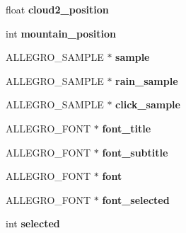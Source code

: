 \begin{DoxyCompactItemize}
\item 
\hypertarget{structMenu_a143c3675204c7cf1381decbfe4be5476}{float {\bfseries cloud2\-\_\-position}}\label{structMenu_a143c3675204c7cf1381decbfe4be5476}

\item 
\hypertarget{structMenu_a10770a9453a92c77d64c7fdb0e34e725}{int {\bfseries mountain\-\_\-position}}\label{structMenu_a10770a9453a92c77d64c7fdb0e34e725}

\item 
\hypertarget{structMenu_a19a25811d2d08b8fa1d1819088168b72}{\-A\-L\-L\-E\-G\-R\-O\-\_\-\-S\-A\-M\-P\-L\-E $\ast$ {\bfseries sample}}\label{structMenu_a19a25811d2d08b8fa1d1819088168b72}

\item 
\hypertarget{structMenu_ad14705d9172d76dc241de8f4657254cc}{\-A\-L\-L\-E\-G\-R\-O\-\_\-\-S\-A\-M\-P\-L\-E $\ast$ {\bfseries rain\-\_\-sample}}\label{structMenu_ad14705d9172d76dc241de8f4657254cc}

\item 
\hypertarget{structMenu_a012f284df5f9d8e39785a264c736c506}{\-A\-L\-L\-E\-G\-R\-O\-\_\-\-S\-A\-M\-P\-L\-E $\ast$ {\bfseries click\-\_\-sample}}\label{structMenu_a012f284df5f9d8e39785a264c736c506}

\item 
\hypertarget{structMenu_aac0297cac51099ec75020a510a6dcbb3}{\-A\-L\-L\-E\-G\-R\-O\-\_\-\-F\-O\-N\-T $\ast$ {\bfseries font\-\_\-title}}\label{structMenu_aac0297cac51099ec75020a510a6dcbb3}

\item 
\hypertarget{structMenu_a18d7377e798bac336e55e253243d4e13}{\-A\-L\-L\-E\-G\-R\-O\-\_\-\-F\-O\-N\-T $\ast$ {\bfseries font\-\_\-subtitle}}\label{structMenu_a18d7377e798bac336e55e253243d4e13}

\item 
\hypertarget{structMenu_aa4e0229cb315ef9e0ea90263b26a37f8}{\-A\-L\-L\-E\-G\-R\-O\-\_\-\-F\-O\-N\-T $\ast$ {\bfseries font}}\label{structMenu_aa4e0229cb315ef9e0ea90263b26a37f8}

\item 
\hypertarget{structMenu_a577ad17dfddafaae41dde63ca7970003}{\-A\-L\-L\-E\-G\-R\-O\-\_\-\-F\-O\-N\-T $\ast$ {\bfseries font\-\_\-selected}}\label{structMenu_a577ad17dfddafaae41dde63ca7970003}

\item 
\hypertarget{structMenu_a608e2768a5458057048bf1c7ab9a81aa}{int {\bfseries selected}}\label{structMenu_a608e2768a5458057048bf1c7ab9a81aa}


\end{DoxyCompactItemize}
